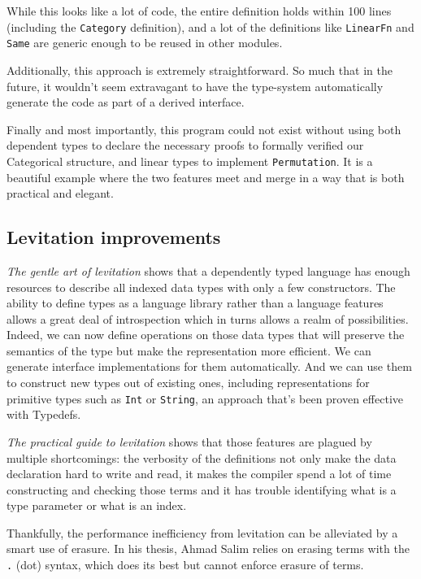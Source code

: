 \documentclass[
]{article}
\begin{document}
While this looks like a lot of code, the entire definition holds within
100 lines (including the \texttt{Category} definition), and a lot of the
definitions like \texttt{LinearFn} and \texttt{Same} are generic enough
to be reused in other modules.

Additionally, this approach is extremely straightforward. So much that
in the future, it wouldn't seem extravagant to have the type-system
automatically generate the code as part of a derived interface.

Finally and most importantly, this program could not exist without using
both dependent types to declare the necessary proofs to formally
verified our Categorical structure, and linear types to implement
\texttt{Permutation}. It is a beautiful example where the two features
meet and merge in a way that is both practical and elegant.

\hypertarget{levitation-improvements}{%
\subsection{Levitation improvements}\label{levitation-improvements}}

\emph{The gentle art of levitation}\cite{levitation} shows that a
dependently typed language has enough resources to describe all indexed
data types with only a few constructors. The ability to define types as
a language library rather than a language features allows a great deal
of introspection which in turns allows a realm of possibilities. Indeed,
we can now define operations on those data types that will preserve the
semantics of the type but make the representation more efficient. We can
generate interface implementations for them automatically. And we can
use them to construct new types out of existing
ones\cite{category_of_containers}\cite{delta_for_data}\cite{indexed_containers},
including representations for primitive types such as \texttt{Int} or
\texttt{String}, an approach that's been proven effective with
Typedefs\cite{typedefs}.

\emph{The practical guide to levitation}\cite{levitation} shows that
those features are plagued by multiple shortcomings: the verbosity of
the definitions not only make the data declaration hard to write and
read, it makes the compiler spend a lot of time constructing and
checking those terms and it has trouble identifying what is a type
parameter or what is an index.

Thankfully, the performance inefficiency from levitation can be
alleviated by a smart use of erasure. In his thesis, Ahmad Salim relies
on erasing terms with the \texttt{.} (dot) syntax, which does its best
but cannot enforce erasure of terms.
\end{document}
